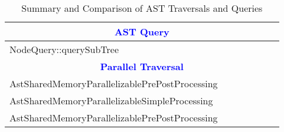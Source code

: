 \begin{table}[htbp]
{\begin{tabular}{||l|c|c|c|c|c|c||}
 \multicolumn{7}{||c||}{\textbf{\textcolor{blue}{AST Query}}} \\\hline \hline
  NodeQuery::querySubTree&  & & &  & & \\ \hline

 \multicolumn{7}{||c||}{\textbf{\textcolor{blue}{Parallel Traversal}}} \\\hline \hline
AstSharedMemoryParallelizablePrePostProcessing &  & & &  & & \\ \hline
AstSharedMemoryParallelizableSimpleProcessing &  & & &  & & \\ \hline
AstSharedMemoryParallelizablePrePostProcessing &  & & &  & & \\ \hline

\end{tabular}
}
\caption{Summary and Comparison of AST Traversals and Queries}
\label{tab:sumTraversal}
\end{table}

